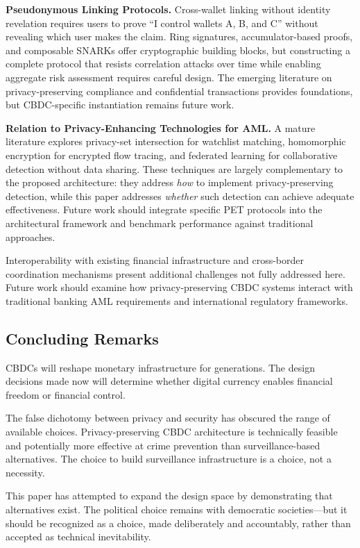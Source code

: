 \documentclass[11pt]{article}
\begin{document}
\textbf{Pseudonymous Linking Protocols.} Cross-wallet linking without identity revelation requires users to prove ``I control wallets A, B, and C'' without revealing which user makes the claim. Ring signatures, accumulator-based proofs, and composable SNARKs \citep{Campanelli2019} offer cryptographic building blocks, but constructing a complete protocol that resists correlation attacks over time while enabling aggregate risk assessment requires careful design. The emerging literature on privacy-preserving compliance \citep{Bunz2020} and confidential transactions provides foundations, but CBDC-specific instantiation remains future work.

\textbf{Relation to Privacy-Enhancing Technologies for AML.} A mature literature explores privacy-set intersection for watchlist matching, homomorphic encryption for encrypted flow tracing, and federated learning for collaborative detection without data sharing. These techniques are largely complementary to the proposed architecture: they address \textit{how} to implement privacy-preserving detection, while this paper addresses \textit{whether} such detection can achieve adequate effectiveness. Future work should integrate specific PET protocols into the architectural framework and benchmark performance against traditional approaches.

Interoperability with existing financial infrastructure and cross-border coordination mechanisms present additional challenges not fully addressed here. Future work should examine how privacy-preserving CBDC systems interact with traditional banking AML requirements and international regulatory frameworks.

\subsection{Concluding Remarks}

CBDCs will reshape monetary infrastructure for generations. The design decisions made now will determine whether digital currency enables financial freedom or financial control.

The false dichotomy between privacy and security has obscured the range of available choices. Privacy-preserving CBDC architecture is technically feasible and potentially more effective at crime prevention than surveillance-based alternatives. The choice to build surveillance infrastructure is a choice, not a necessity.

This paper has attempted to expand the design space by demonstrating that alternatives exist. The political choice remains with democratic societies---but it should be recognized as a choice, made deliberately and accountably, rather than accepted as technical inevitability.
\end{document}
